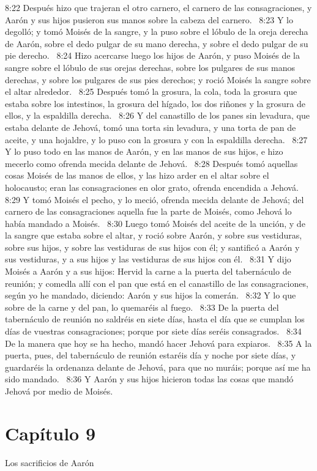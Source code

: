 8:22 Después hizo que trajeran el otro carnero, el carnero de las consagraciones, y Aarón y sus hijos pusieron sus manos sobre la cabeza del carnero.  
8:23 Y lo degolló; y tomó Moisés de la sangre, y la puso sobre el lóbulo de la oreja derecha de Aarón, sobre el dedo pulgar de su mano derecha, y sobre el dedo pulgar de su pie derecho.  
8:24 Hizo acercarse luego los hijos de Aarón, y puso Moisés de la sangre sobre el lóbulo de sus orejas derechas, sobre los pulgares de sus manos derechas, y sobre los pulgares de sus pies derechos; y roció Moisés la sangre sobre el altar alrededor.  
8:25 Después tomó la grosura, la cola, toda la grosura que estaba sobre los intestinos, la grosura del hígado, los dos riñones y la grosura de ellos, y la espaldilla derecha.  
8:26 Y del canastillo de los panes sin levadura, que estaba delante de Jehová, tomó una torta sin levadura, y una torta de pan de aceite, y una hojaldre, y lo puso con la grosura y con la espaldilla derecha.  
8:27 Y lo puso todo en las manos de Aarón, y en las manos de sus hijos, e hizo mecerlo como ofrenda mecida delante de Jehová.  
8:28 Después tomó aquellas cosas Moisés de las manos de ellos, y las hizo arder en el altar sobre el holocausto; eran las consagraciones en olor grato, ofrenda encendida a Jehová.  
8:29 Y tomó Moisés el pecho, y lo meció, ofrenda mecida delante de Jehová; del carnero de las consagraciones aquella fue la parte de Moisés, como Jehová lo había mandado a Moisés.  
8:30 Luego tomó Moisés del aceite de la unción, y de la sangre que estaba sobre el altar, y roció sobre Aarón, y sobre sus vestiduras, sobre sus hijos, y sobre las vestiduras de sus hijos con él; y santificó a Aarón y sus vestiduras, y a sus hijos y las vestiduras de sus hijos con él.  
8:31 Y dijo Moisés a Aarón y a sus hijos: Hervid la carne a la puerta del tabernáculo de reunión; y comedla allí con el pan que está en el canastillo de las consagraciones, según yo he mandado, diciendo: Aarón y sus hijos la comerán.  
8:32 Y lo que sobre de la carne y del pan, lo quemaréis al fuego.  
8:33 De la puerta del tabernáculo de reunión no saldréis en siete días, hasta el día que se cumplan los días de vuestras consagraciones; porque por siete días seréis consagrados.  
8:34 De la manera que hoy se ha hecho, mandó hacer Jehová para expiaros.  
8:35 A la puerta, pues, del tabernáculo de reunión estaréis día y noche por siete días, y guardaréis la ordenanza delante de Jehová, para que no muráis; porque así me ha sido mandado.  
8:36 Y Aarón y sus hijos hicieron todas las cosas que mandó Jehová por medio de Moisés.  
\section*{Capítulo 9 }
Los sacrificios de Aarón  

